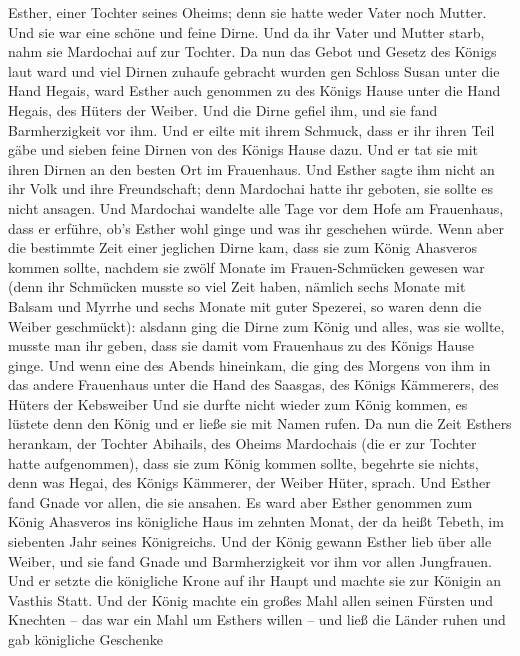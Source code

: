 Esther, einer Tochter seines Oheims; denn sie hatte weder Vater noch
Mutter. Und sie war eine schöne und feine Dirne. Und da ihr Vater und
Mutter starb, nahm sie Mardochai auf zur Tochter.  Da nun
das Gebot und Gesetz des Königs laut ward und viel Dirnen zuhaufe
gebracht wurden gen Schloss Susan unter die Hand Hegais, ward Esther
auch genommen zu des Königs Hause unter die Hand Hegais, des Hüters der
Weiber.  Und die Dirne gefiel ihm, und sie fand
Barmherzigkeit vor ihm. Und er eilte mit ihrem Schmuck, dass er ihr
ihren Teil gäbe und sieben feine Dirnen von des Königs Hause dazu. Und
er tat sie mit ihren Dirnen an den besten Ort im Frauenhaus.
 Und Esther sagte ihm nicht an ihr Volk und ihre
Freundschaft; denn Mardochai hatte ihr geboten, sie sollte es nicht
ansagen.  Und Mardochai wandelte alle Tage vor dem Hofe am
Frauenhaus, dass er erführe, ob's Esther wohl ginge und was ihr
geschehen würde.  Wenn aber die bestimmte Zeit einer
jeglichen Dirne kam, dass sie zum König Ahasveros kommen sollte, nachdem
sie zwölf Monate im Frauen-Schmücken gewesen war (denn ihr Schmücken
musste so viel Zeit haben, nämlich sechs Monate mit Balsam und Myrrhe
und sechs Monate mit guter Spezerei, so waren denn die Weiber
geschmückt):  alsdann ging die Dirne zum König und alles,
was sie wollte, musste man ihr geben, dass sie damit vom Frauenhaus zu
des Königs Hause ginge.  Und wenn eine des Abends
hineinkam, die ging des Morgens von ihm in das andere Frauenhaus unter
die Hand des Saasgas, des Königs Kämmerers, des Hüters der Kebsweiber
Und sie durfte nicht wieder zum König kommen, es lüstete denn den König
und er ließe sie mit Namen rufen.  Da nun die Zeit Esthers
herankam, der Tochter Abihails, des Oheims Mardochais (die er zur
Tochter hatte aufgenommen), dass sie zum König kommen sollte, begehrte
sie nichts, denn was Hegai, des Königs Kämmerer, der Weiber Hüter,
sprach. Und Esther fand Gnade vor allen, die sie ansahen. 
Es ward aber Esther genommen zum König Ahasveros ins königliche Haus im
zehnten Monat, der da heißt Tebeth, im siebenten Jahr seines
Königreichs.  Und der König gewann Esther lieb über alle
Weiber, und sie fand Gnade und Barmherzigkeit vor ihm vor allen
Jungfrauen. Und er setzte die königliche Krone auf ihr Haupt und machte
sie zur Königin an Vasthis Statt.  Und der König machte ein
großes Mahl allen seinen Fürsten und Knechten -- das war ein Mahl um
Esthers willen -- und ließ die Länder ruhen und gab königliche Geschenke
